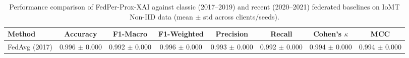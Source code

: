 \begin{table}[t]
\centering
\caption{Performance comparison of FedPer-Prox-XAI against classic (2017--2019) and recent (2020--2021) federated baselines on IoMT Non-IID data (mean $\pm$ std across clients/seeds).}
\label{tab:sota_comparison}
\begin{tabular}{lccccccc}
\toprule
Method & Accuracy & F1-Macro & F1-Weighted & Precision & Recall & Cohen's $\kappa$ & MCC \\
\midrule
FedAvg (2017) & 0.996 $\pm$ 0.000 & 0.992 $\pm$ 0.000 & 0.996 $\pm$ 0.000 & 0.993 $\pm$ 0.000 & 0.992 $\pm$ 0.000 & 0.994 $\pm$ 0.000 & 0.994 $\pm$ 0.000 \\
\bottomrule
\end{tabular}
\end{table}

